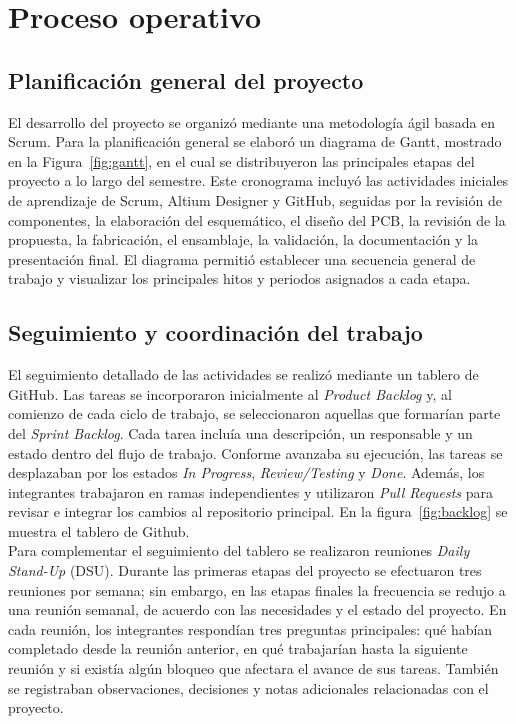 \documentclass[journal,trans]{IEEEtran}
\begin{document}
\section{Proceso operativo}


\subsection{Planificación general del proyecto}
El desarrollo del proyecto se organizó mediante una metodología ágil basada en Scrum. Para la planificación general se elaboró un diagrama de Gantt, mostrado en la Figura~\ref{fig:gantt}, en el cual se distribuyeron las principales etapas del proyecto a lo largo del semestre. Este cronograma incluyó las actividades iniciales de aprendizaje de Scrum, Altium Designer y GitHub, seguidas por la revisión de componentes, la elaboración del esquemático, el diseño del PCB, la revisión de la propuesta, la fabricación, el ensamblaje, la validación, la documentación y la presentación final. El diagrama permitió establecer una secuencia general de trabajo y visualizar los principales hitos y periodos asignados a cada etapa.

\subsection{Seguimiento y coordinación del trabajo}
El seguimiento detallado de las actividades se realizó mediante un tablero de GitHub. Las tareas se incorporaron inicialmente al \textit{Product Backlog} y, al comienzo de cada ciclo de trabajo, se seleccionaron aquellas que formarían parte del \textit{Sprint Backlog}. Cada tarea incluía una descripción, un responsable y un estado dentro del flujo de trabajo. Conforme avanzaba su ejecución, las tareas se desplazaban por los estados \textit{In Progress}, \textit{Review/Testing} y \textit{Done}. Además, los integrantes trabajaron en ramas independientes y utilizaron \textit{Pull Requests} para revisar e integrar los cambios al repositorio principal. En la figura~\ref{fig:backlog} se muestra el tablero de Github.\\

Para complementar el seguimiento del tablero se realizaron reuniones \textit{Daily Stand-Up} (DSU). Durante las primeras etapas del proyecto se efectuaron tres reuniones por semana; sin embargo, en las etapas finales la frecuencia se redujo a una reunión semanal, de acuerdo con las necesidades y el estado del proyecto. En cada reunión, los integrantes respondían tres preguntas principales: qué habían completado desde la reunión anterior, en qué trabajarían hasta la siguiente reunión y si existía algún bloqueo que afectara el avance de sus tareas. También se registraban observaciones, decisiones y notas adicionales relacionadas con el proyecto.\\
\end{document}
